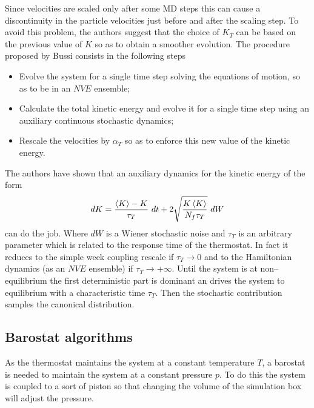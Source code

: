 Since velocities are scaled only after some \ac{MD} steps this can cause a discontinuity in the particle
velocities just before and after the scaling step. To avoid this problem, the authors suggest that the choice of
$K_T$ can be based on the previous value of $K$ so as to obtain a smoother evolution. The procedure proposed by
Bussi \etal consists in the following steps
\begin{itemize}
	\item Evolve the system for a single time step solving the equations of motion, so as to be in an $NVE$ ensemble;%
	\item Calculate the total kinetic energy and evolve it for a single time step using an auxiliary continuous stochastic dynamics;%
	\item Rescale the velocities by $\alpha_T$ so as to enforce this new value of the kinetic energy.
\end{itemize}

The authors have shown that an auxiliary dynamics for the kinetic energy of the form
\begin{equation*}
	dK = \frac{\left \langle K \right \rangle - K}{\tau_T}\ dt + 2 \sqrt{\frac{K\left \langle K \right \rangle}{N_f\tau_T}}\ dW
\end{equation*}
can do the job. Where $dW$ is a Wiener stochastic noise and $\tau_T$ is an arbitrary parameter which is related
to the response time of the thermostat. In fact it reduces to the simple week coupling rescale if
$\tau_T\rightarrow 0$ and to the Hamiltonian dynamics (as an $NVE$ ensemble) if $\tau_T\rightarrow +\infty$.
Until the system is at non--equilibrium the first deterministic part is dominant an drives the system to
equilibrium with a characteristic time $\tau_T$. Then the stochastic contribution samples the canonical
distribution.


\subsection{Barostat algorithms} %
As the thermostat maintains the system at a constant temperature $T$, a barostat is needed to maintain the system
at a constant pressure $p$. To do this the system is coupled to a sort of piston so that changing the volume of
the simulation box will adjust the pressure.

